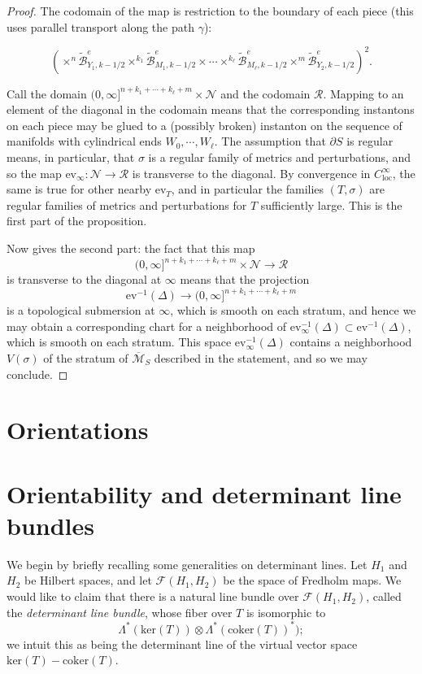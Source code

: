 \documentclass[10pt,a4paper]{amsart}
\newcounter{qchap}
\newcommand{\qchapter}[1]{\refstepcounter{qchap}\setcounter{section}{0}\setcounter{equation}{0}\setcounter{theorem}{0}\renewcommand{\thesection}{\theqchap.\arabic{section}}\renewcommand{\theequation}{\theqchap.\arabic{equation}}\section*{#1}}
\newcommand{\chapter}[1]{\qchapter{#1}}
\theoremstyle{definition}
\theoremstyle{remark}
\numberwithin{figure}{qchap}
\begin{document}
\begin{proof}
The codomain of the map is restriction to the boundary of each piece (this uses parallel transport along the path $\gamma$):

$$\left(\times^n \widetilde{\mathcal B}^e_{Y_1, k-1/2} \times^{k_1} \widetilde{\mathcal B}^e_{M_1, k-1/2} \times \cdots \times^{k_\ell} \widetilde{\mathcal B}^e_{M_\ell, k-1/2} \times^m \widetilde{\mathcal B}^e_{Y_2,k-1/2}\right)^2.$$

Call the  domain $(0, \infty]^{n+k_1 + \cdots + k_\ell + m} \times \mathcal N$ and the codomain $\mathcal R$. Mapping to an element of the diagonal in the codomain means that the corresponding instantons on each piece may be glued to a (possibly broken) instanton on the sequence of manifolds with cylindrical ends $W_0, \cdots, W_\ell$. The assumption that $\partial S$ is regular means, in particular, that $\sigma$ is a regular family of metrics and perturbations, and so the map $\text{ev}_\infty: \mathcal N \to \mathcal R$ is transverse to the diagonal. By convergence in $C^\infty_{\text{loc}}$, the same is true for other nearby $\text{ev}_T$, and in particular the families $(T, \sigma)$ are regular families of metrics and perturbations for $T$ sufficiently large. This is the first part of the proposition.

Now \cite[Lemma~19.3.3]{KMSW} gives the second part: the fact that this map $$(0, \infty]^{n+k_1 + \cdots + k_\ell + m} \times \mathcal N \to \mathcal R$$ is transverse to the diagonal at $\infty$ means that the projection $$\text{ev}^{-1}(\Delta) \to (0, \infty]^{n+k_1 + \cdots + k_\ell + m}$$ is a topological submersion at $\infty$, which is smooth on each stratum, and hence we may obtain a corresponding chart for a neighborhood of $\text{ev}_\infty^{-1}(\Delta) \subset \text{ev}^{-1}(\Delta)$, which is smooth on each stratum. This space $\text{ev}_\infty^{-1}(\Delta)$ contains a neighborhood $V(\sigma)$ of the stratum of $\overline{\mathcal M}_S$ described in the statement, and so we may conclude.
\end{proof}

\chapter{Orientations}\label{chap:5}
\section{Orientability and determinant line bundles}\label{sec:or-detlines}
We begin by briefly recalling some generalities on determinant lines. Let $H_1$ and $H_2$ be Hilbert spaces, and let $\mathcal F(H_1, H_2)$ be the space of Fredholm maps. We would like to claim that there is a natural line bundle over $\mathcal F(H_1, H_2)$, called the \textit{determinant line bundle}, whose fiber over $T$ is isomorphic to 
$$\Lambda^*(\text{ker}(T)) \otimes \Lambda^*(\text{coker}(T))^*);$$ 
we intuit this as being the determinant line of the virtual vector space $\text{ker}(T) - \text{coker}(T)$.
\end{document}

